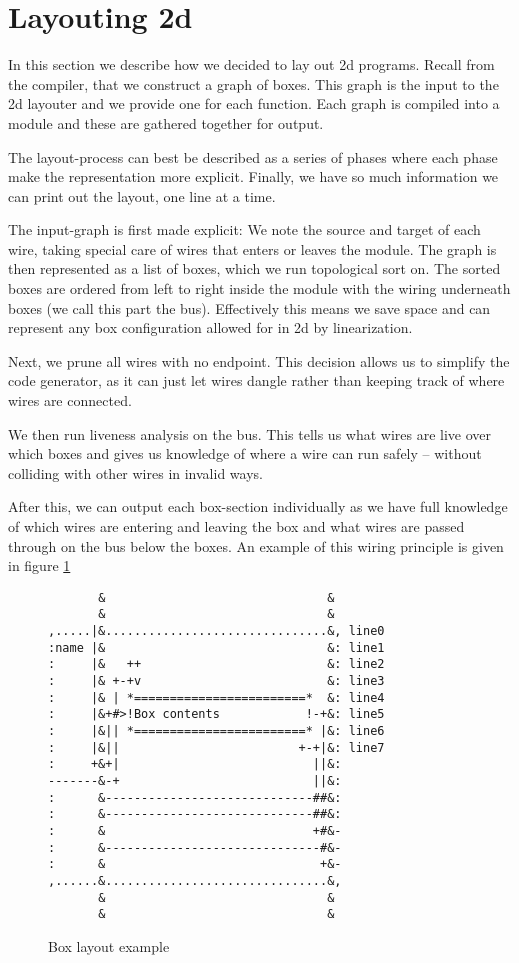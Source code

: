\section{Layouting 2d}

In this section we describe how we decided to lay out 2d
programs. Recall from the compiler, that we construct a graph of
boxes. This graph is the input to the 2d layouter and we provide one
for each function. Each graph is compiled into a module and these are
gathered together for output.

The layout-process can best be described as a series of phases where
each phase make the representation more explicit. Finally, we have so
much information we can print out the layout, one line at a time.

The input-graph is first made explicit: We note the source and target
of each wire, taking special care of wires that enters or leaves the
module. The graph is then represented as a list of boxes, which we run
topological sort on. The sorted boxes are ordered from left to right
inside the module with the wiring underneath boxes (we call this part
the bus). Effectively this means we save space and can represent any
box configuration allowed for in 2d by linearization.

Next, we prune all wires with no endpoint. This decision allows us to
simplify the code generator, as it can just let wires dangle rather
than keeping track of where wires are connected.

We then run liveness analysis on the bus. This tells us what wires are
live over which boxes and gives us knowledge of where a wire can run
safely -- without colliding with other wires in invalid ways.

After this, we can output each box-section individually as we have
full knowledge of which wires are entering and leaving the box and
what wires are passed through on the bus below the boxes. An example
of this wiring principle is given in figure \ref{fig:1}
\begin{figure}
  \centering

  \begin{center}
\begin{verbatim}
       &                               &
       &                               &
,.....|&...............................&, line0
:name |&                               &: line1
:     |&   ++                          &: line2
:     |& +-+v                          &: line3
:     |& | *========================*  &: line4
:     |&+#>!Box contents            !-+&: line5
:     |&|| *========================* |&: line6
:     |&||                         +-+|&: line7
:     +&+|                           ||&:
-------&-+                           ||&:
:      &-----------------------------##&:
:      &-----------------------------##&:
:      &                             +#&-
:      &------------------------------#&-
:      &                              +&-
,......&...............................&,
       &                               &
       &                               &
\end{verbatim}
  \end{center}
  \caption{Box layout example}\label{fig:1}
\end{figure}

